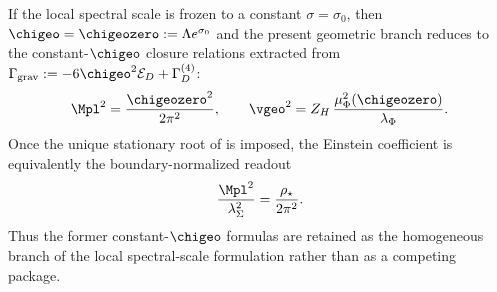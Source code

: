 \begin{corollary}
\label{cor:constant-scale-reduction}
If the local spectral scale is frozen to a constant $\sigma=\sigma_0$, then
$\chigeo=\chigeozero:=\Lambda e^{\sigma_0}$ and the present geometric branch reduces to the
constant-$\chigeo$ closure relations extracted from
$\Gamma_{\mathrm{grav}}:=-6\chigeo^2\mathcal E_D+\Gamma_D^{(4)}$:
\[
\Mpl^2=\frac{\chigeozero^2}{2\pi^2},
\qquad
\vgeo^2=Z_H\,\frac{\mu_\Phi^2(\chigeozero)}{\lambda_\Phi}.
\]
Once the unique stationary root of  is imposed, the
Einstein coefficient is equivalently the boundary-normalized readout
\[
\frac{\Mpl^2}{\lambda_\Sigma^2}=\frac{\rho_\star}{2\pi^2}.
\]
Thus the former constant-$\chigeo$ formulas are retained as the homogeneous branch of the local
spectral-scale formulation rather than as a competing package.
\end{corollary}


